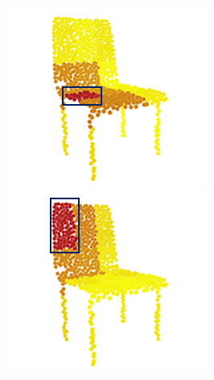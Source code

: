 \documentclass[letterpaper]{article}
\begin{document}
\begin{figure}[htbp]
\begin{center}
\begin{minipage}[b]{0.8\linewidth}
\begin{center}
\begin{minipage}[b]{0.12\linewidth}
\begin{center}
\end{center}
\end{minipage}
\begin{minipage}[b]{0.12\linewidth}
\begin{center}
\includegraphics[width=1.0\linewidth]{images/atten_pic/chair_attention_2.png}
\end{center}
\end{minipage}
\begin{minipage}[b]{0.12\linewidth}
\begin{center}
\includegraphics[width=1.0\linewidth]{images/atten_pic/chair_attention_3.png}

\end{center}
\end{minipage}
\end{center}
\end{minipage}
\end{center}
\end{figure}
\end{document}
